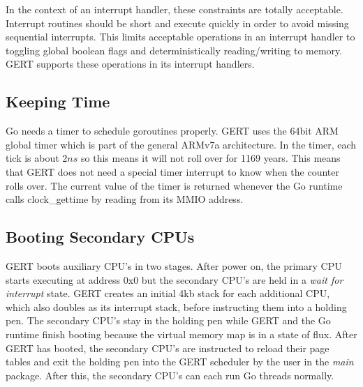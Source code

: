In the context of an interrupt handler, these constraints are totally acceptable. Interrupt
routines should be short and execute quickly in order to avoid missing sequential
interrupts. This limits acceptable operations in an interrupt handler to toggling global boolean
flags and deterministically reading/writing to memory. GERT supports these operations in its interrupt
handlers.

\subsection{Keeping Time}

Go needs a timer to schedule goroutines properly. GERT uses the 64bit ARM global timer which
is part of the general ARMv7a architecture. In the timer, each tick is about 2$ns$ so this means it will
not roll over for 1169 years. This means that GERT does not need a special timer interrupt to know when the
counter rolls over. The current value of the timer is returned whenever the Go runtime calls
clock\_gettime by reading from its MMIO address.

\subsection{Booting Secondary CPUs}

GERT boots auxiliary CPU's in two stages. After power on, the primary CPU starts executing at address 0x0 but the
secondary CPU's are held in a \textit{wait for interrupt} state. GERT creates an initial 4kb stack for each additional CPU,
which also doubles as its interrupt stack, before instructing them into a holding pen. The secondary CPU's
stay in the holding pen while GERT and the Go runtime finish booting because the virtual memory map is
in a state of flux. After GERT has booted, the secondary CPU's are instructed to reload their page tables
and exit the holding pen into the GERT scheduler by the user in the \textit{main} package. After this, the secondary CPU's
can each run Go threads normally.


